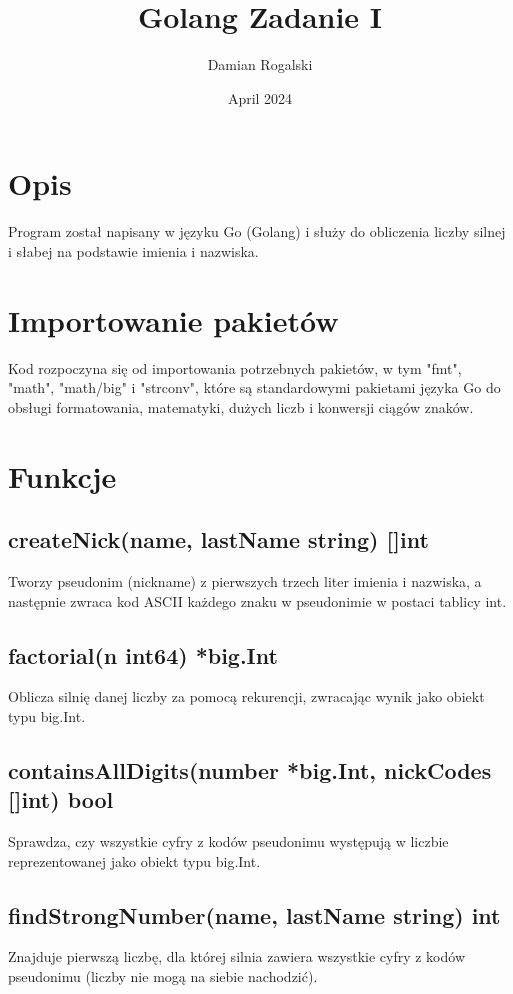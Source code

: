 \documentclass{article}
\title{Golang Zadanie I}
\author{Damian Rogalski}
\date{April 2024}
\begin{document}
\maketitle

\section{Opis}

Program został napisany w języku Go (Golang) i służy do obliczenia liczby silnej i słabej na podstawie imienia i nazwiska.

\section{Importowanie pakietów}
Kod rozpoczyna się od importowania potrzebnych pakietów, w tym "fmt", "math", "math/big" i "strconv", które są standardowymi pakietami języka Go do obsługi formatowania, matematyki, dużych liczb i konwersji ciągów znaków.

\section{Funkcje}
\subsection{createNick(name, lastName string) []int}
Tworzy pseudonim (nickname) z pierwszych trzech liter imienia i nazwiska, a następnie zwraca kod ASCII każdego znaku w pseudonimie w postaci tablicy int.

\subsection{factorial(n int64) *big.Int}
Oblicza silnię danej liczby za pomocą rekurencji, zwracając wynik jako obiekt typu big.Int.

\subsection{containsAllDigits(number *big.Int, nickCodes []int) bool}
Sprawdza, czy wszystkie cyfry z kodów pseudonimu występują w liczbie reprezentowanej jako obiekt typu big.Int.

\newpage
\subsection{findStrongNumber(name, lastName string) int}
Znajduje pierwszą liczbę, dla której silnia zawiera wszystkie cyfry z kodów pseudonimu (liczby nie mogą na siebie nachodzić).
\end{document}
